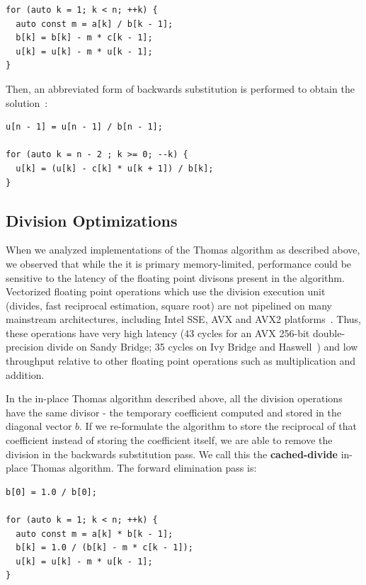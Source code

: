 \documentclass[conference]{IEEEtran}
\begin{document}
\begin{lstlisting}
for (auto k = 1; k < n; ++k) {
  auto const m = a[k] / b[k - 1];
  b[k] = b[k] - m * c[k - 1];
  u[k] = u[k] - m * u[k - 1];
} 
\end{lstlisting}

Then, an abbreviated form of backwards substitution is performed to obtain the
solution~\cite{??}:

\begin{lstlisting}
u[n - 1] = u[n - 1] / b[n - 1];

for (auto k = n - 2 ; k >= 0; --k) {
  u[k] = (u[k] - c[k] * u[k + 1]) / b[k];
} 
\end{lstlisting}


\subsection{Division Optimizations}

When we analyzed implementations of the Thomas algorithm as described above, we
observed that while the it is primary memory-limited, performance could be
sensitive to the latency of the floating point divisons present in the
algorithm. Vectorized floating point operations which use the division
execution unit (divides, fast reciprocal estimation, square root) are not
pipelined on many mainstream architectures, including Intel SSE, AVX and AVX2
platforms~\cite{}. Thus, these operations have very high latency (43 cycles for
an AVX 256-bit double-precision divide on Sandy Bridge; 35 cycles on Ivy Bridge
and Haswell~\cite{}) and low throughput relative to other floating point
operations such as multiplication and addition.

In the in-place Thomas algorithm described above, all the division operations
have the same divisor - the temporary coefficient computed and stored in the
diagonal vector \(b\). If we re-formulate the algorithm to store the reciprocal
of that coefficient instead of storing the coefficient itself, we are able to
remove the division in the backwards substitution pass. We call this the
\textbf{cached-divide} in-place Thomas algorithm. The forward elimination pass
is:

\begin{lstlisting}
b[0] = 1.0 / b[0];

for (auto k = 1; k < n; ++k) {
  auto const m = a[k] * b[k - 1];
  b[k] = 1.0 / (b[k] - m * c[k - 1]);
  u[k] = u[k] - m * u[k - 1];
} 
\end{lstlisting}
\end{document}
